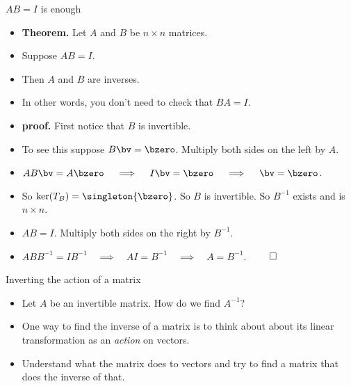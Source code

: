 \documentclass{beamer}
\begin{document}
\begin{frame}{$AB=I$ is enough}

\begin{itemize}
\item \textbf{Theorem.} Let $A$  and $B$ be $n\times n$ matrices.
\item Suppose $AB=I$.
\item Then $A$ and $B$ are inverses.
\item In other words, you don't need to check that $BA=I$.
\item \textbf{proof.} First notice that $B$ is invertible.
\item To see this suppose $B\bv=\bzero$. Multiply both sides on the left by $A$.
\item $AB\bv=A\bzero\quad \implies \quad I\bv = \bzero \quad \implies \quad \bv = \bzero$.
\item So $\ker(T_B)=\singleton{\bzero}$. So $B$ is invertible. So $B^{-1}$ exists and is $n\times n$.
\item $AB=I$. Multiply both sides  on the right by $B^{-1}$.
\item $ABB^{-1} = I B^{-1} \quad \implies \quad A I = B^{-1}\quad \implies \quad  A  = B^{-1}$. $\qed$
\end{itemize}
\end{frame}


\begin{frame}{Inverting the action of a matrix}

\begin{itemize}
\item Let $A$ be an invertible matrix. How do we find $A^{-1}$?
\item One way to find the inverse of a matrix is to think about
about its linear transformation as an \emph{action} on vectors.
\item Understand what the matrix does to vectors and try to find
a matrix that does the inverse of that.
\end{itemize}
\end{frame}
\end{document}
